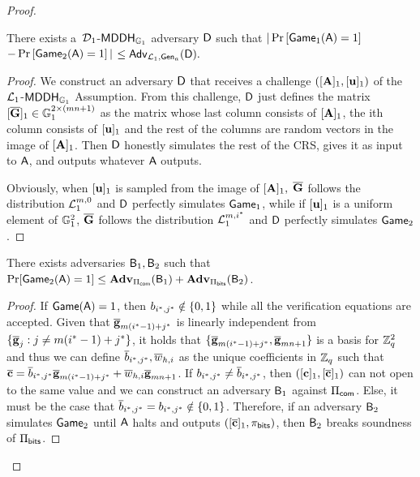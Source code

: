 \begin{proof}
\begin{description}
\begin{lemma} There exists a\ $\mathcal{D}_1$-$\mathsf{MDDH}_{\mathbb{G}_1}$ adversary $\mathsf{D}$ such that
$|\Pr\left[\mathsf{Game}_{1}(\mathsf{A})=1\right]$ $-\Pr\left[\mathsf{Game}_{2}(\mathsf{A})=1\right]|$ $\leq
    \mathsf{Adv}_{\mathcal{L}_1,\mathsf{Gen}_a}(\mathsf{D}).$
\end{lemma}
\begin{proof}
We construct an adversary $\mathsf{D}$ that receives 
a challenge $([\mathbf{{A}}]_1,[\mathbf{u}]_1)$ of the 
$\mathcal{L}_1$-$\mathsf{MDDH}_{\mathbb{G}_1}$ Assumption. From this challenge, $\mathsf{D}$ just defines the matrix  $[\overline{\mathbf{{G}}}]_1\in\mathbb{G}_1^{2\times(mn+1)}$ as the matrix whose last column consists of $[\mathbf{{A}}]_1$, the ith column consists of $[\mathbf{u}]_1$ and the rest of the columns are random vectors in the image of $[\mathbf{{A}}]_1$. Then $\mathsf{D}$ honestly simulates the rest of the CRS, gives it as input to $\mathsf{A}$, and outputs whatever $\mathsf{A}$ outputs.

Obviously, when $[\mathbf{u}]_1$ is sampled from 
the image of $[\mathbf{{A}}]_1,$ $\overline{\mathbf{{G}}}$ follows the distribution $\mathcal{L}_1^{m,0}$ and $\mathsf{D}$ perfectly simulates $\mathsf{Game}_1$, while if $[\mathbf{u}]_1$ is a uniform element of $\mathbb{G}^2_1$, $\overline{\mathbf{{G}}}$ follows the distribution $\mathcal{L}_1^{m,i^*}$ and $\mathsf{D}$ perfectly simulates $\mathsf{Game}_2$. 
\end{proof}

\begin{lemma}
There exists adversaries $\mathsf{B}_1,\mathsf{B}_2$ such that $\Pr[\mathsf{Game}_2(\mathsf{A})=1]\leq\mathbf{Adv}_{\Pi_{\mathsf{com}}}(\mathsf{B}_1)+\mathbf{Adv}_{\Pi_{\mathsf{bits}}}(\mathsf{B}_2)$.
\end{lemma}

\begin{proof}
If $\mathsf{Game}(\mathsf{A})=1$, then $b_{i^*,j^*}\notin\{0,1\}$ while all the verification equations are accepted. Given that ${\overline{\mathbf{g}}}_{m(i^*-1)+j^*}$ is linearly independent from $\{{\overline{\mathbf{g}}}_j:j\neq m(i^*-1)+j^*\}$, it holds that $\{{\overline{\mathbf{g}}}_{m(i^*-1)+j^*},{\overline{\mathbf{g}}}_{mn+1}\}$ is a basis for $\mathbb{Z}_q^2$ and thus we can define $\overline{b}_{i^*,j^*},\overline{w}_{h,i}$ as the unique coefficients in $\mathbb{Z}_q$ such that ${\overline{\mathbf{c}}} = \overline{b}_{i^*,j^*}{\overline{\mathbf{g}}}_{m(i^*-1)+j^*}+\overline{w}_{h,i}{\overline{\mathbf{g}}}_{mn+1}$. If $b_{i^*,j^*}\neq\overline{b}_{i^*,j^*}$, then $([\mathbf{c}]_1,[{\overline{\mathbf{c}}}]_1)$ can not open to the same value and we can construct an adversary $\mathsf{B}_1$ against $\Pi_{\mathsf{com}}$. Else, it must be the case that $\overline{b}_{i^*,j^*}=b_{i^*,j^*}\notin\{0,1\}$. Therefore, if an adversary $\mathsf{B}_2$ simulates $\mathsf{Game}_2$ until $\mathsf{A}$ halts and outputs $([{\overline{\mathbf{c}}}]_1,\pi_{\mathsf{bits}})$, then $\mathsf{B}_2$ breaks soundness of $\Pi_{\mathsf{bits}}$. 
\end{proof}


\end{description}
\end{proof}
